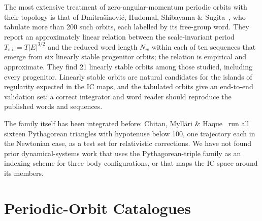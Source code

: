 \documentclass[11pt,a4paper]{article}
\begin{document}
The most extensive treatment of zero-angular-momentum periodic orbits with their topology is that
of Dmitra\v{s}inovi\'{c}, Hudomal, Shibayama \& Sugita~\cite{dmitrasinovic2018}, who tabulate more
than 200 such orbits, each labelled by its free-group word.  They report an approximately linear
relation between the scale-invariant period $T_{\mathrm{s.i.}} = T|E|^{3/2}$ and the reduced word
length $N_w$ within each of ten sequences that emerge from six linearly stable progenitor orbits;
the relation is empirical and approximate.  They find 21 linearly stable orbits among those
studied, including every progenitor.  Linearly stable orbits are natural candidates for the
islands of regularity expected in the IC maps, and the tabulated orbits give an end-to-end
validation set: a correct integrator and word reader should reproduce the published words and
sequences.

The family itself has been integrated before: Chitan, Myll\"{a}ri \& Haque~\cite{chitan2022} run
all sixteen Pythagorean triangles with hypotenuse below 100, one trajectory each in the Newtonian
case, as a test set for relativistic corrections.  We have not found prior dynamical-systems work
that uses the Pythagorean-triple family as an indexing scheme for three-body configurations, or
that maps the IC space around its members.

\section{Periodic-Orbit Catalogues}
\label{sec:catalogues}
\end{document}
